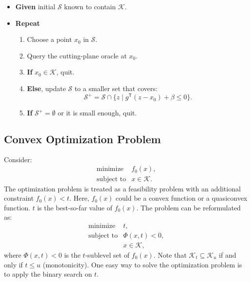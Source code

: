 \documentclass[final,leqno]{siamltex}
\providecommand{\tightlist}{%
  \setlength{\itemsep}{0pt}\setlength{\parskip}{0pt}}
\begin{document}
\begin{itemize}
\tightlist
\item
  \textbf{Given} initial \(\mathcal{S}\) known to contain \(\mathcal{K}\).
\item
  \textbf{Repeat}

  \begin{enumerate}
  \def\labelenumi{\arabic{enumi}.}
  \tightlist
  \item
    Choose a point \(x_0\) in \(\mathcal{S}\).
  \item
    Query the cutting-plane oracle at \(x_0\).
  \item
    \textbf{If} \(x_0 \in \mathcal{K}\), quit.
  \item
    \textbf{Else}, update \(\mathcal{S}\) to a smaller set that covers:
    \[\mathcal{S}^+ = \mathcal{S} \cap \{z \mid g^\mathsf{T} (z - x_0) + \beta \leq 0\}.\]
  \item
    \textbf{If} \(\mathcal{S}^+ = \emptyset\) or it is small enough, quit.
  \end{enumerate}
\end{itemize}

\hypertarget{sec:convex-optimization-problem}{%
\subsection{Convex Optimization Problem}\label{sec:convex-optimization-problem}}

Consider:
\begin{equation}\begin{array}{ll}
    \text{minimize}     & f_0(x), \\
    \text{subject to}   & x \in \mathcal{K}.
  \end{array}
\label{eq:convex-optimization}\end{equation}
The optimization problem is treated as a feasibility problem with an additional constraint \(f_0(x) < t\). Here, \(f_0(x)\) could be a convex function or a quasiconvex function. \(t\) is the best-so-far value of \(f_0(x)\). The problem can be reformulated as:
\begin{equation}\begin{array}{ll}
    \text{minimize}   & t, \\
    \text{subject to} & \Phi(x, t) < 0, \\
                      & x \in \mathcal{K},
  \end{array}
\label{eq:cvx-in-feasibility-form}\end{equation}
where \(\Phi(x, t) < 0\) is the \(t\)-sublevel set of \(f_0(x)\). Note that \(\mathcal{K}_t \subseteq \mathcal{K}_u\) if and only if \(t \leq u\) (monotonicity). One easy way to solve the optimization problem is to apply the binary search on \(t\).
\end{document}
